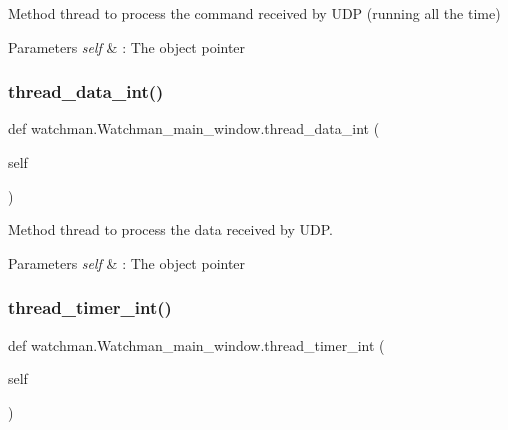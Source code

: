 Method thread to process the command received by U\+DP (running all the time) 


\begin{DoxyParams}{Parameters}
{\em self} & \+: The object pointer \\
\hline
\end{DoxyParams}
\mbox{\label{classwatchman_1_1_watchman__main__window_a59982ccfdd3e2145e28e9b6200ccf5ce}} 
\subsubsection{\texorpdfstring{thread\_data\_int()}{thread\_data\_int()}}
{\footnotesize\ttfamily def watchman.\+Watchman\+\_\+main\+\_\+window.\+thread\+\_\+data\+\_\+int (\begin{DoxyParamCaption}\item[{}]{self }\end{DoxyParamCaption})}



Method thread to process the data received by U\+DP. 


\begin{DoxyParams}{Parameters}
{\em self} & \+: The object pointer \\
\hline
\end{DoxyParams}
\mbox{\label{classwatchman_1_1_watchman__main__window_a084e9e77a70c9f8e6e36fec24a8f590d}} 
\subsubsection{\texorpdfstring{thread\_timer\_int()}{thread\_timer\_int()}}
{\footnotesize\ttfamily def watchman.\+Watchman\+\_\+main\+\_\+window.\+thread\+\_\+timer\+\_\+int (\begin{DoxyParamCaption}\item[{}]{self }\end{DoxyParamCaption})}



